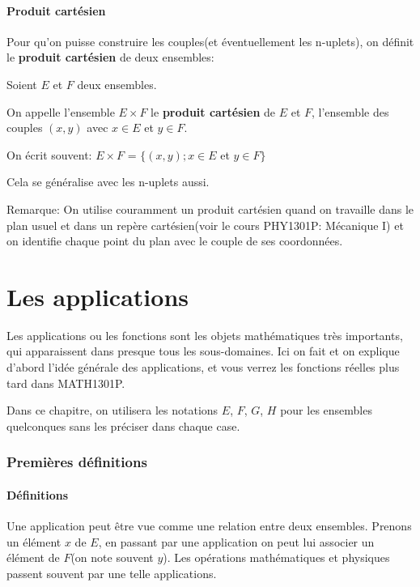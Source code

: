 \documentclass{article}
\begin{document}
\subsection{Produit cartésien}

Pour qu'on puisse construire les couples(et éventuellement les n-uplets), on définit le \textbf{produit cartésien} de deux ensembles:

\begin{tcolorbox}[colback=red!5!white,colframe=red!75!black,title=Définition 2.8]

Soient $E$ et $F$ deux ensembles. 

On appelle l'ensemble $E \times F$ le \textbf{produit cartésien} de $E$ et $F$, l'ensemble des couples $(x,y)$ avec $x \in E$ et $y \in F$.

On écrit souvent: $E \times F$ = $\{ (x,y); x \in E$ et $y \in F\}$
\tcblower

Cela se généralise avec les n-uplets aussi. 
\end{tcolorbox}

Remarque: On utilise couramment un produit cartésien quand on travaille dans le plan usuel et dans un repère cartésien(voir le cours PHY1301P: Mécanique I) et on identifie chaque point du plan avec le couple de ses coordonnées.






\newpage
\part{Les applications}

Les applications ou les fonctions sont les objets mathématiques très importants, qui apparaissent dans presque tous les sous-domaines. Ici on fait et on explique d'abord l'idée générale des applications, et vous verrez les fonctions réelles plus tard dans MATH1301P.

Dans ce chapitre, on utilisera les notations $E$, $F$, $G$, $H$ pour les ensembles quelconques sans les préciser dans chaque case.


\section{Premières définitions}
\subsection{Définitions}

Une application peut être vue comme une relation entre deux ensembles. Prenons un élément $x$ de $E$, en passant par une application on peut lui associer un élément de $F$(on note souvent $y$). Les opérations mathématiques et physiques passent souvent par une telle applications.
\end{document}
